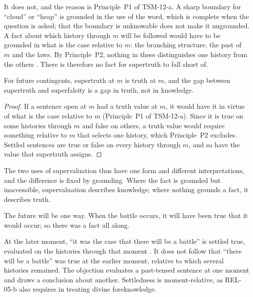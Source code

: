 \documentclass{situationist-preprint}
\begin{document}
It does not, and the reason is Principle~P1 of TSM-12-a. A sharp boundary for \enquote{cloud} or \enquote{heap} is grounded in the use of the word, which is complete when the question is asked; that the boundary is unknowable does not make it ungrounded. A fact about which history through $m$ will be followed would have to be grounded in what is the case relative to $m$: the branching structure, the past of $m$ and the laws. By Principle~P2, nothing in these distinguishes one history from the others \citep{BelnapGreen1994}. There is therefore no fact for supertruth to fall short of.

\begin{proposition}\label{p:gap}
For future contingents, supertruth at $m$ is truth at $m$, and the gap between supertruth and superfalsity is a gap in truth, not in knowledge.
\end{proposition}

\begin{proof}
If a sentence open at $m$ had a truth value at $m$, it would have it in virtue of what is the case relative to $m$ (Principle~P1 of TSM-12-a). Since it is true on some histories through $m$ and false on others, a truth value would require something relative to $m$ that selects one history, which Principle~P2 excludes. Settled sentences are true or false on every history through $m$, and so have the value that supertruth assigns.
\end{proof}

The two uses of supervaluation thus have one form and different interpretations, and the difference is fixed by grounding. Where the fact is grounded but inaccessible, supervaluation describes knowledge; where nothing grounds a fact, it describes truth.

\begin{objection}
The future will be one way. When the battle occurs, it will have been true that it would occur; so there was a fact all along.
\end{objection}

\begin{reply}
At the later moment, \enquote{it was the case that there will be a battle} is settled true, evaluated on the histories through that moment \citep{Thomason1970}. It does not follow that \enquote{there will be a battle} was true at the earlier moment, relative to which several histories remained. The objection evaluates a past-tensed sentence at one moment and draws a conclusion about another. Settledness is moment-relative, as REL-05-b also requires in treating divine foreknowledge.
\end{reply}
\end{document}

